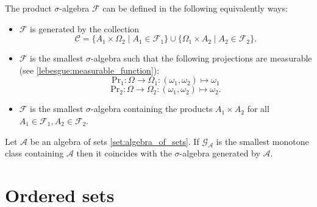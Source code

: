     \begin{construct}\label{set:product_of_sigma_algebras}
        The product $\sigma$-algebra $\mathcal{F}$ can be defined in the following equivalently ways:
        \begin{itemize}
            \item $\mathcal{F}$ is generated by the collection
                \[\mathcal{C} = \{A_1\times \Omega_2\mid A_1\in\mathcal{F}_1\}\cup\{\Omega_1\times A_2\mid A_2\in\mathcal{F}_2\}.\]
            \item $\mathcal{F}$ is the smallest $\sigma$-algebra such that the following projections are measurable (see \ref{lebesgue:measurable_function}):
                \[\text{Pr}_1:\Omega\rightarrow\Omega_1:(\omega_1,\omega_2)\mapsto\omega_1\]
                \[\text{Pr}_2:\Omega\rightarrow\Omega_2:(\omega_1,\omega_2)\mapsto\omega_2.\]
            \item $\mathcal{F}$ is the smallest $\sigma$-algebra containing the products $A_1\times A_2$ for all $A_1\in\mathcal{F}_1, A_2\in\mathcal{F}_2$.
        \end{itemize}
    \end{construct}


    \begin{theorem}\label{set:theorem:monotone_class}
        Let $\mathcal{A}$ be an algebra of sets \ref{set:algebra_of_sets}. If $\mathcal{G}_\mathcal{A}$ is the smallest monotone class containing $\mathcal{A}$ then it coincides with the $\sigma$-algebra generated by $\mathcal{A}$.
    \end{theorem}

\section{Ordered sets}\label{section:ordered_sets}
